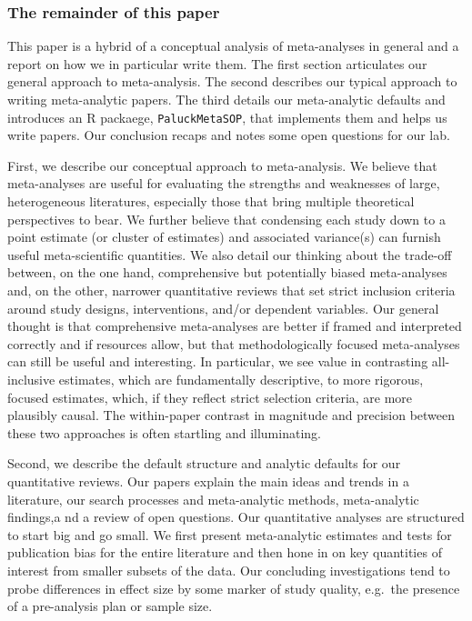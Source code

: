 \documentclass[
  man]{apa6}
\begin{document}
\subsubsection{The remainder of this paper}\label{the-remainder-of-this-paper}

This paper is a hybrid of a conceptual analysis of meta-analyses in general and a report on how we in particular write them. The first section articulates our general approach to meta-analysis. The second describes our typical approach to writing meta-analytic papers. The third details our meta-analytic defaults and introduces an R packaege, \texttt{PaluckMetaSOP}, that implements them and helps us write papers. Our conclusion recaps and notes some open questions for our lab.

First, we describe our conceptual approach to meta-analysis. We believe that meta-analyses are useful for evaluating the strengths and weaknesses of large, heterogeneous literatures, especially those that bring multiple theoretical perspectives to bear. We further believe that condensing each study down to a point estimate (or cluster of estimates) and associated variance(s) can furnish useful meta-scientific quantities. We also detail our thinking about the trade-off between, on the one hand, comprehensive but potentially biased meta-analyses and, on the other, narrower quantitative reviews that set strict inclusion criteria around study designs, interventions, and/or dependent variables. Our general thought is that comprehensive meta-analyses are better if framed and interpreted correctly and if resources allow, but that methodologically focused meta-analyses can still be useful and interesting. In particular, we see value in contrasting all-inclusive estimates, which are fundamentally descriptive, to more rigorous, focused estimates, which, if they reflect strict selection criteria, are more plausibly causal. The within-paper contrast in magnitude and precision between these two approaches is often startling and illuminating.

Second, we describe the default structure and analytic defaults for our quantitative reviews. Our papers explain the main ideas and trends in a literature, our search processes and meta-analytic methods, meta-analytic findings,a nd a review of open questions. Our quantitative analyses are structured to start big and go small. We first present meta-analytic estimates and tests for publication bias for the entire literature and then hone in on key quantities of interest from smaller subsets of the data. Our concluding investigations tend to probe differences in effect size by some marker of study quality, e.g.~the presence of a pre-analysis plan or sample size.
\end{document}
